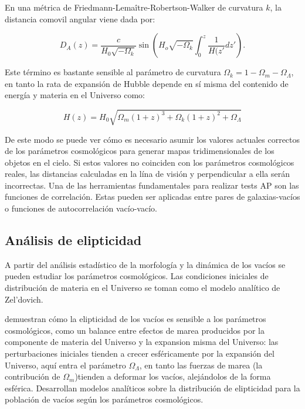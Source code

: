 \documentclass[preprint]{aastex62}
\begin{document}
  En una métrica de  Friedmann-Lema\^itre-Robertson-Walker de curvatura $k$, la distancia
  comovil angular viene dada por:
  
  \begin{equation}
    D_A(z) = \frac{c}{H_0\sqrt{-\Omega_k}} \sin \left( H_o\sqrt{-\Omega_k}
    \int_0^z \frac{1}{H(z'} dz' \right).
  \end{equation}
  
  Este término es bastante sensible al parámetro de curvatura
  $\Omega_k = 1 - \Omega_m - \Omega_\Lambda$, en tanto la rata de expansión de Hubble
  depende en sí misma del contenido de energía y materia en el Universo como:

  \begin{equation}
    H(z) = H_0 \sqrt{ \Omega_m(1+z)^3 + \Omega_k(1+z)^2+\Omega_\Lambda}
  \end{equation}

  De este modo se puede ver cómo es necesario asumir los valores actuales correctos de los
  parámetros cosmológicos para generar mapas tridimensionales de los objetos en el cielo. Si
  estos valores no coinciden con los parámetros
  cosmológicos reales, las distancias calculadas en la lína de visión y perpendicular a ella serán
  incorrectas. Una de las herramientas fundamentales para realizar tests AP son las funciones
  de correlación. Estas pueden ser aplicadas entre pares de galaxias-vacíos o funciones de
  autocorrelación vacío-vacío.
  
  \subsection{Análisis de elipticidad}
  
  A partir del análisis estadístico de la morfología y la dinámica de los vacíos se pueden estudiar
  los parámetros cosmológicos. Las condiciones iniciales de distribución de materia en el Universo
  se toman como el modelo analítico de Zel'dovich. 

  \citet{https://arxiv.org/pdf/astro-ph/0610520.pdf}
  demuestran cómo la elipticidad de los vacíos
  es sensible a los parámetros cosmológicos, como un balance entre efectos de marea producidos
  por la componente de materia del Universo y la expansion misma del Universo: las perturbaciones
  iniciales tienden a crecer esféricamente por la expansión del Universo, aquí entra el parámetro
  $\Omega_\Lambda$, en tanto las fuerzas de marea (la contribución de $\Omega_m$)tienden a deformar
  los vacíos, alejándolos de la forma esférica. Desarrollan modelos analíticos sobre la distribución
  de elipticidad para la población de vacíos según los parámetros cosmológicos.
\end{document}
